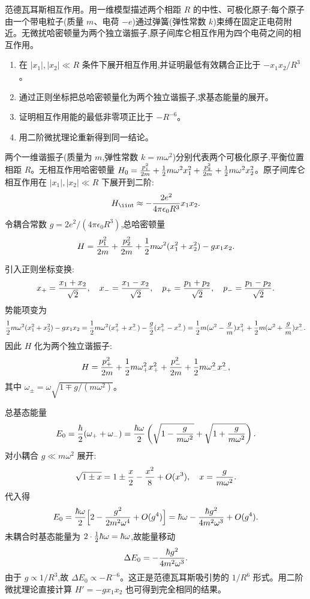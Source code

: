 \begin{question}
范德瓦耳斯相互作用。用一维模型描述两个相距 $R$ 的中性、可极化原子:每个原子由一个带电粒子(质量 $m$、电荷 $-e$)通过弹簧(弹性常数 $k$)束缚在固定正电荷附近。无微扰哈密顿量为两个独立谐振子,原子间库仑相互作用为四个电荷之间的相互作用。
\begin{enumerate}
\item 在 $|x_1|,|x_2|\ll R$ 条件下展开相互作用,并证明最低有效耦合正比于 $-x_1x_2/R^3$。
\item 通过正则坐标把总哈密顿量化为两个独立谐振子,求基态能量的展开。
\item 证明相互作用能的最低非零项正比于 $-R^{-6}$。
\item 用二阶微扰理论重新得到同一结论。
\end{enumerate}
\begin{solution}
两个一维谐振子(质量为 $m$,弹性常数 $k=m\omega^2$)分别代表两个可极化原子,平衡位置相距 $R$。无相互作用哈密顿量 $H_0={p_1^2\over2m}+{1\over2}m\omega^2x_1^2+{p_2^2\over2m}+{1\over2}m\omega^2x_2^2$。原子间库仑相互作用在 $|x_1|,|x_2|\ll R$ 下展开到二阶:
\[
H_{\rm \ii nt} \approx -{2e^2\over4\pi\epsilon_0 R^3}x_1x_2.
\]
令耦合常数 $g=2e^2/(4\pi\epsilon_0 R^3)$,总哈密顿量
\[
H = {p_1^2\over2m}+{p_2^2\over2m}+{1\over2}m\omega^2(x_1^2+x_2^2)-g x_1x_2.
\]

引入正则坐标变换:
\[
x_+ = {x_1+x_2\over\sqrt2},\quad x_- = {x_1-x_2\over\sqrt2},\quad
p_+ = {p_1+p_2\over\sqrt2},\quad p_- = {p_1-p_2\over\sqrt2}.
\]
势能项变为
\[
{1\over2}m\omega^2(x_1^2+x_2^2)-g x_1x_2
= {1\over2}m\omega^2(x_+^2+x_-^2)-{g\over2}(x_+^2-x_-^2)
= {1\over2}m(\omega^2-{g\over m})x_+^2
+ {1\over2}m(\omega^2+{g\over m})x_-^2.
\]
因此 $H$ 化为两个独立谐振子:
\[
H = {p_+^2\over2m}+{1\over2}m\omega_+^2x_+^2
+ {p_-^2\over2m}+{1\over2}m\omega_-^2x_-^2,
\]
其中 $\omega_\pm = \omega\sqrt{1\mp g/(m\omega^2)}$。

总基态能量
\[
E_0 = {\hbar\over2}(\omega_++\omega_-)
= {\hbar\omega\over2}\left(\sqrt{1-{g\over m\omega^2}}+\sqrt{1+{g\over m\omega^2}}\right).
\]
对小耦合 $g\ll m\omega^2$ 展开:
\[
\sqrt{1\pm x} = 1\pm{x\over2}-{x^2\over8}+O(x^3),\quad x={g\over m\omega^2}.
\]
代入得
\[
E_0 = {\hbar\omega\over2}\Bigl[2 - {g^2\over2m^2\omega^4}+O(g^4)\Bigr]
= \hbar\omega - {\hbar g^2\over4m^2\omega^3}+O(g^4).
\]
未耦合时基态能量为 $2\cdot{1\over2}\hbar\omega=\hbar\omega$,故能量移动
\[
\Delta E_0 = -{\hbar g^2\over4m^2\omega^3}.
\]
由于 $g\propto 1/R^3$,故 $\Delta E_0 \propto -R^{-6}$。这正是范德瓦耳斯吸引势的 $1/R^6$ 形式。用二阶微扰理论直接计算 $H'=-g x_1x_2$ 也可得到完全相同的结果。
\end{solution}
\end{question}

